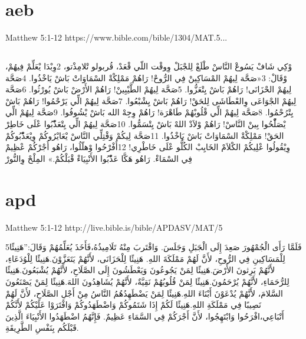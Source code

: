 \documentclass[12pt,fleqn,titlepage,twoside,a4paper]{book}
\begin{document}
\section{aeb}

Matthew 5:1-12 https://www.bible.com/bible/1304/MAT.5...

\begin{arab}[utf]
\section*{}


وْكِي شَافْ يَسُوعْ النَّاسْ طْلَعْ لِلجْبَلْ وِوقْت اللّي قْعَدْ، قُربولو تْلامِذْتو، 2وِبْدَا يْعَلِّمْ فِيهُمْ، وْقَالْ:
3«صَحَّة لِيهُمْ المْسَاكِينْ فِي الرُّوحْ!
رَاهُمْ مَمْلِكْةْ السْمَاوَاتْ بَاشْ يَاخْذُوا.
4صَحَّة لِيهُمْ الحْزَانَى!
رَاهُمْ بَاشْ يِتْعَزُّوا.
5صَحَّة لِيهُمْ الطَّيْبِينْ!
رَاهُمْ الأَرْضْ بَاشْ يُورْثُوا.
6صَحَّة لِيهُمْ الجْوَاعَى وِالعْطَاشَى لِلحَقْ!
رَاهُمْ بَاشْ يِشْبْعُوا.
7صَحَّة لِيهُمْ الِّي يَرْحْمُوا!
رَاهُمْ بَاشْ يِتْرُحْمُوا.
8صَحَّة لِيهُمْ الِّي قْلُوبْهُمْ طَاهْرَة!
رَاهُمْ وِجِهْ الله بَاشْ يْشُوفُوا.
9صَحَّة لِيهُمْ الِّي يْصَلّْحُوا بِينْ النَّاسْ!
رَاهُمْ وْلاَدْ اللهْ بَاشْ يِتْسَمُّوا.
10صَحَّة لِيهُمْ الِّي يِتْعَذّْبُوا عْلَى خَاطِرْ الحَقْ!
مَمْلِكْةْ السْمَاوَاتْ بَاشْ يَاخْذُوا.
11صَحَّة لِيكُمْ وَقْتِلِّي النَّاسْ يْعَايْرُوكُمْ وِيْعَذّْبُوكُمْ وِيْقُولُوا عْلِيكُمْ الكْلاَمْ الخَايِبْ الكُلُّو عْلَى خَاطْرِي! 12أَفْرْحُوا وْهلّلُوا، رَاهُو أَجْرْكُمْ عْظِيمْ فِي السْمَاءْ. رَاهُو هَكَّا عَذّْبُوا الأَنْبِيَاءْ قْبَلْكُمْ.»
المِلْحْ وِالنُّورْ

\end{arab}

\section{apd}

Matthew 5:1-12 http://live.bible.is/bible/APDASV/MAT/5

\begin{arab}[utf]


5فَلَمَّا رَأَى الْجُمْهُورَ صَعِدَ إِلَى الْجَبَلِ وَجَلَسَ. وَاقْتَربَ مِنْهُ تَلَامِيذُهُ،فَأَخَذَ يُعَلِّمُهُمْ وَقَالَ:”هَنِيئًا لِلْمَسَاكِينِ فِي الرُّوحِ، لأَنَّ لَهُمْ مَمْلَكَةَ اللهِ. هَنِيئًا لِلْحَزَانَى، لأَنَّهُمْ يَتَعَزَّوْنَ.هَنِيئًا لِلْوُدَعَاءِ، لأَنَّهُمْ يَرِثونَ الأَرْضَ.هَنِيئًا لِمَنْ يَجُوعُونَ وَيَعْطَشُونَ إِلَى الصَّلَاحِ، لأَنَّهُمْ يُشْبَعُونَ.هَنِيئًا لِلرُّحَمَاءِ، لأَنَّهُمْ يُرْحَمُونَ.هَنِيئًا لِمَنْ قُلُوبُهُمْ نَقِيَّةٌ، لأَنَّهُمْ يُشَاهِدُونَ اللهَ.هَنِيئًا لِمَنْ يَصْنَعُونَ السَّلامَ، لأَنَّهُمْ يُدْعَوْنَ أَبْنَاءَ اللهِ.هَنِيئًا لِمَنْ يَضْطَهِدُهُمُ النَّاسُ مِنْ أَجْلِ الصَّلَاحِ، لأَنَّ لَهُمْ نَصِيبًا فِي مَمْلَكَةِ اللهِ.هَنِيئًا لَكُمْ إِذَا شَتَمُوكُمْ وَاضْطَهَدُوكُمْ وَافْتَرَوْا عَلَيْكُمْ لأَنَّكُمْ أَتْبَاعِي،افْرَحُوا وَابْتَهِجُوا، لأَنَّ أَجْرَكُمْ فِي السَّمَاءِ عَظِيمٌ. فَإِنَّهُمُ اضْطَهَدُوا الأَنْبِيَاءَ الَّذِينَ قَبْلَكُم بِنَفْسِ الطَّرِيقَةِ.
\end{arab}
\end{document}
